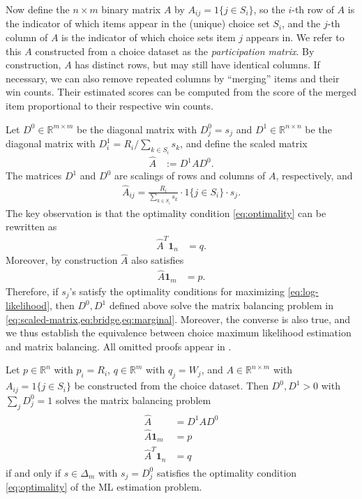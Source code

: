 Now define the $n\times m$ binary matrix $A$ by
$A_{ij}=1\{j\in S_{i}\}$, so the $i$-th row of $A$
is the indicator of which items appear in the (unique) choice set $S_i$, and the $j$-th column of $A$ is the indicator of which choice sets
item $j$ appears in. We refer to this $A$ constructed from a choice dataset as the \emph{participation matrix}. By construction, $A$ has distinct rows, but may still have identical columns. If necessary, we can also remove repeated columns by ``merging'' items and their win counts. Their estimated scores can be computed from the score of the merged item proportional to their respective win counts.

Let $D^{0}\in\mathbb{R}^{m\times m}$ be the diagonal matrix with
$D_{j}^{0}=s_{j}$ and $D^{1}\in\mathbb{R}^{n\times n}$ be the
diagonal matrix with $D_{i}^{1}={R_i}/{\sum_{k\in S_{i}}s_{k}}$,
and define the scaled matrix
\begin{align}
\label{eq:scaled-matrix}
\hat{A} & :=D^{1}AD^{0}.
\end{align}
The matrices $D^{1}$ and $D^{0}$ are scalings of rows and columns
of $A$, respectively, and
\begin{align*}
    \hat{A}_{ij} = \frac{R_i}{\sum_{k\in S_{i}}s_{k}}\cdot1\{j\in S_{i}\}\cdot s_{j}.
\end{align*}
The key observation is that the optimality condition \eqref{eq:optimality} can be rewritten as
\begin{align}
\label{eq:bridge}
\hat{A}^T \mathbf{1}_n & = q.
\end{align}
Moreover, by construction $\hat{A}$ also satisfies
\begin{align}
\label{eq:marginal}
\hat{A}\mathbf{1}_m & = p.
\end{align}
 Therefore, if $s_j$'s satisfy the optimality conditions for maximizing \eqref{eq:log-likelihood}, then $D^0,D^1$  defined above solve the matrix balancing problem in \cref{eq:scaled-matrix,eq:bridge,eq:marginal}. Moreover, the converse is also true, and we thus establish the equivalence between choice maximum likelihood estimation and matrix balancing. All omitted proofs appear in .
\begin{theorem}
\label{prop:mle-scaling}
Let $p\in\mathbb{R}^{n}$ with $p_{i}=R_i$, $q\in\mathbb{R}^{m}$ with $q_{j}=W_j$, and 
$A\in\mathbb{R}^{n\times m}$
with $A_{ij}=1\{j\in S_{i}\}$ be constructed from the choice dataset. Then  $D^{0},D^{1}>0$ with $\sum_j D_j^0=1$ solves the matrix balancing problem
\begin{align}
\label{eq:equation-system}
\begin{split}
\hat{A} & =D^{1}AD^{0}\\
\hat{A}\mathbf{1}_m & =p\\
\hat{A}^{T} \mathbf{1}_n & =q
\end{split}
\end{align}
if and only if $s \in \Delta_m$ with $s_j=D^0_j$ satisfies the optimality condition \eqref{eq:optimality} of the ML estimation problem.
\end{theorem}
